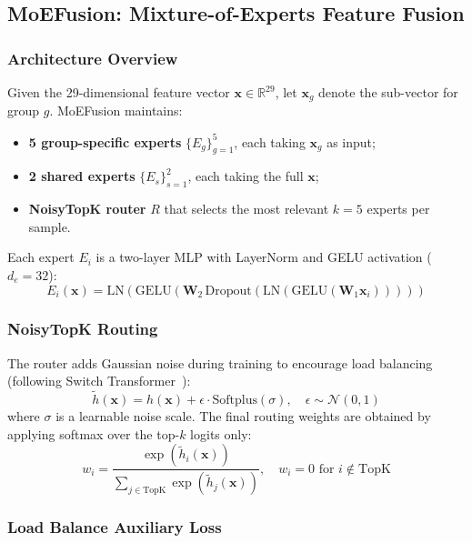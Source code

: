 ﻿\documentclass[sigconf,review,anonymous]{acmart}
\newcommand{\sys}{MoEFusion}
\begin{document}
\subsection{\sys{}: Mixture-of-Experts Feature Fusion}
\label{sec:moe}

\subsubsection{Architecture Overview}

Given the 29-dimensional feature vector $\mathbf{x} \in \mathbb{R}^{29}$,
let $\mathbf{x}_g$ denote the sub-vector for group $g$.
\sys{} maintains:
\begin{itemize}
\item \textbf{5 group-specific experts} $\{E_g\}_{g=1}^{5}$,
  each taking $\mathbf{x}_g$ as input;
\item \textbf{2 shared experts} $\{E_s\}_{s=1}^{2}$,
  each taking the full $\mathbf{x}$;
\item \textbf{NoisyTopK router} $R$ that selects the most relevant $k{=}5$
  experts per sample.
\end{itemize}
Each expert $E_i$ is a two-layer MLP with LayerNorm and GELU activation
($d_e{=}32$):
\begin{equation}
E_i(\mathbf{x}) = \mathrm{LN}(\mathrm{GELU}(\mathbf{W}_2\,
  \mathrm{Dropout}(\mathrm{LN}(\mathrm{GELU}(\mathbf{W}_1 \mathbf{x}_i)))))
\end{equation}

\subsubsection{NoisyTopK Routing}

The router adds Gaussian noise during training to encourage load balancing
(following Switch Transformer~\cite{fedus2022switch}):
\begin{equation}
\tilde{h}(\mathbf{x}) = h(\mathbf{x}) + \epsilon \cdot \mathrm{Softplus}(\sigma),
\quad \epsilon \sim \mathcal{N}(0, 1)
\end{equation}
where $\sigma$ is a learnable noise scale.
The final routing weights are obtained by applying softmax over the top-$k$
logits only:
\begin{equation}
w_i = \frac{\exp(\tilde{h}_i(\mathbf{x}))}{\sum_{j \in \mathrm{TopK}}
  \exp(\tilde{h}_j(\mathbf{x}))}, \quad w_i = 0 \text{ for } i \notin \mathrm{TopK}
\end{equation}

\subsubsection{Load Balance Auxiliary Loss}
\end{document}
